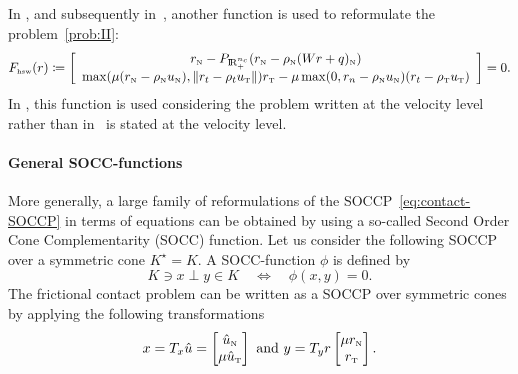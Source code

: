 {In \citep{Stadler_SIOPT2004,Hueber.ea_SJSC2008}, and subsequently in~\citep{Koziara.Bicanic_CMAME2008}, another function is used to reformulate the problem~\ref{prob:II}:
\begin{equation}
  \label{eq:HSW-II}
    F_{\hswtwo}(r) \coloneqq \left[ \begin{array}{c}
    r_\n - P_{\RR^{n_c}_+}(r_\n - \rho_\n (W r +  q)_\n) \\
    \max(\mu(r_\n-\rho_\n u_\n),\|r_t-\rho_tu_\t\|)r_\t - \mu \max(0,r_n-\rho_\n u_\n)(r_t-\rho_\t u_\t)
  \end{array}\right] =0.
\end{equation}
In \citep{Hueber.ea_SJSC2008}, this function is used considering the problem written at the velocity level rather than in~\citep{Koziara.Bicanic_CMAME2008} is stated at the velocity level.







\paragraph{General SOCC-functions}

More generally, a large family of reformulations of the SOCCP~\eqref{eq:contact-SOCCP} in terms of equations can be obtained by using a so-called Second Order Cone Complementarity (SOCC) function. Let us consider the following SOCCP over a symmetric cone $K^\star = K $. A SOCC-function $\phi$ is defined by
\begin{equation}
  \label{eq:SOCC-function}
  K \ni x \perp y \in K \quad\Longleftrightarrow\quad \phi(x,y)=0.
\end{equation}
The frictional contact problem can be written as a SOCCP over symmetric cones by applying the following transformations
\begin{equation}
  \label{eq:SOCC-function1}
  x = T_x \hat u =
  \begin{bmatrix}
    \hat u_\n \\
    \mu \hat u_{\t}
  \end{bmatrix}
  \text{ and }  y =T_y r
  \begin{bmatrix}
    \mu r_\n \\
    r_\t
  \end{bmatrix}.
\end{equation}

}
